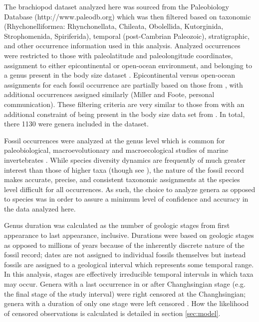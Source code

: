 \documentclass[11pt]{article}
\begin{document}
The brachiopod dataset analyzed here was sourced from the Paleobiology Database (http://www.paleodb.org) which was then filtered based on taxonomic (Rhychonelliformea: Rhynchonellata, Chileata, Obolellida, Kutorginida, Strophomenida, Spiriferida), temporal (post-Cambrian Paleozoic), stratigraphic, and other occurrence information used in this analysis. Analyzed occurrences were restricted to those with paleolatitude and paleolongitude coordinates, assignment to either epicontinental or open-ocean environment, and belonging to a genus present in the body size dataset \citep{Payne2014}. Epicontinental versus open-ocean assignments for each fossil occurrence are partially based on those from \citet{Miller2009a}, with additional occurrences assigned similarly (Miller and Foote, personal communication). These filtering criteria are very similar to those from \citet{Foote2013} with an additional constraint of being present in the body size data set from \citet{Payne2014}. In total, there 1130 were genera included in the dataset.

Fossil occurrences were analyzed at the genus level which is common for paleobiological, macroevolutionary and macroecological studies of marine invertebrates \citep{Alroy2010,Foote2013,Harnik2013,Kiessling2007a,Miller2009a,Nurnberg2013a,Nurnberg2015,Payne2007,Simpson2009,Vilhena2013}. While species diversity dynamics are frequently of much greater interest than those of higher taxa (though see \citealt{Foote2014b,Hoehn2015}), the nature of the fossil record makes accurate, precise, and consistent taxonomic assignments at the species level difficult for all occurrences. As such, the choice to analyze genera as opposed to species was in order to assure a minimum level of confidence and accuracy in the data analyzed here.

Genus duration was calculated as the number of geologic stages from first appearance to last appearance, inclusive. Durations were based on geologic stages as opposed to millions of years because of the inherently discrete nature of the fossil record; dates are not assigned to individual fossils themselves but instead fossils are assigned to a geological interval which represents some temporal range. In this analysis, stages are effectively irreducible temporal intervals in which taxa may occur. Genera with a last occurrence in or after Changhsingian stage (e.g. the final stage of the study interval) were right censored at the Changhsingian; genera with a duration of only one stage were left censored \citep{Klein2003}. How the likelihood of censored observations is calculated is detailed in section \ref{sec:model}.
\end{document}
